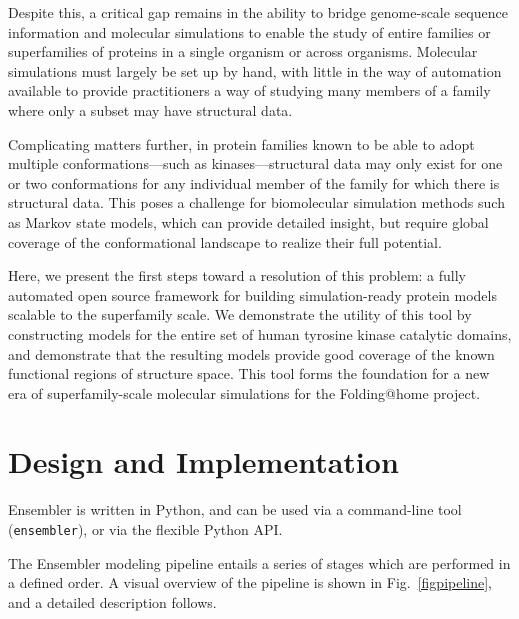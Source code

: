\documentclass[aps,pre,twocolumn,nofootinbib,superscriptaddress,linenumbers]{revtex4-1}
\begin{document}
Despite this, a critical gap remains in the ability to bridge genome-scale sequence information and molecular simulations to enable the study of entire families or superfamilies of proteins in a single organism or across organisms. 
Molecular simulations must largely be set up by hand, with little in the way of automation available to provide practitioners a way of studying many members of a family where only a subset may have structural data.

Complicating matters further, in protein families known to be able to adopt multiple conformations---such as kinases---structural data may only exist for one or two conformations for any individual member of the family for which there is structural data.
This poses a challenge for biomolecular simulation methods such as Markov state models, which can provide detailed insight, but require global coverage of the conformational landscape to realize their full potential.

Here, we present the first steps toward a resolution of this problem: a fully automated open source framework for building simulation-ready protein models scalable to the superfamily scale.
We demonstrate the utility of this tool by constructing models for the entire set of human tyrosine kinase catalytic domains, and demonstrate that the resulting models provide good coverage of the known functional regions of structure space.
This tool forms the foundation for a new era of superfamily-scale molecular simulations for the Folding@home project.

\section{Design and Implementation}


Ensembler is written in Python, and can be used via a command-line tool ({\tt ensembler}), or via the flexible Python API.


The Ensembler modeling pipeline entails a series of stages which are performed in a defined order. 
A visual overview of the pipeline is shown in Fig.~\ref{figpipeline}, and a detailed description follows.
\end{document}

